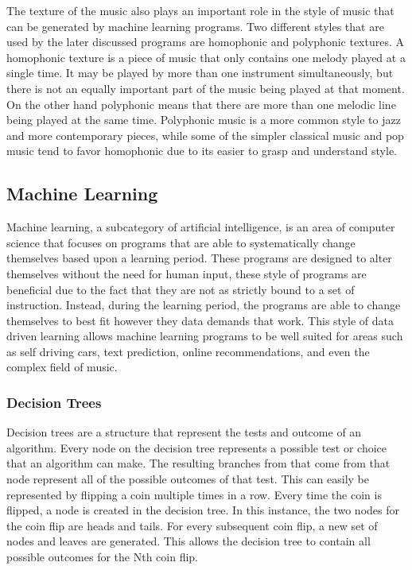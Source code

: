 \documentclass{sig-alternate}
\begin{document}
The texture of the music also plays an important role in the style of music that can be generated by machine learning programs. Two different styles that are used by the later discussed programs are homophonic and polyphonic textures. A homophonic texture is a piece of music that only contains one melody played at a single time. It may be played by more than one instrument simultaneously, but there is not an equally important part of the music being played at that moment. On the other hand polyphonic means that there are more than one melodic line being played at the same time. Polyphonic music is a more common style to jazz and more contemporary pieces, while some of the simpler classical music and pop music tend to favor homophonic due to its easier to grasp and understand style.

\subsection{Machine Learning}
\label{sec:machinelearning}
	Machine learning, a subcategory of artificial intelligence, is an area of computer science that focuses on programs that are able to systematically change themselves based upon a learning period. These programs are designed to alter themselves without the need for human input, these style of programs are beneficial due to the fact that they are not as strictly bound to a set of instruction. Instead, during the learning period, the programs are able to change themselves to best fit however they data demands that work. This style of data driven learning allows machine learning programs to be well suited for areas such as self driving cars, text prediction, online recommendations, and even the complex field of music.
\subsubsection{Decision Trees}
\label{sec:decision_trees}
	Decision trees are a structure that represent the tests and outcome of an algorithm. Every node on the decision tree represents a possible test or choice that an algorithm can make. The resulting branches from that come from that node represent all of the possible outcomes of that test. This can easily be represented by flipping a coin multiple times in a row. Every time the coin is flipped, a node is created in the decision tree. In this instance, the two nodes for the coin flip are heads and tails. For every subsequent coin flip, a new set of nodes and leaves are generated. This allows the decision tree to contain all possible outcomes for the Nth coin flip.
\end{document}
